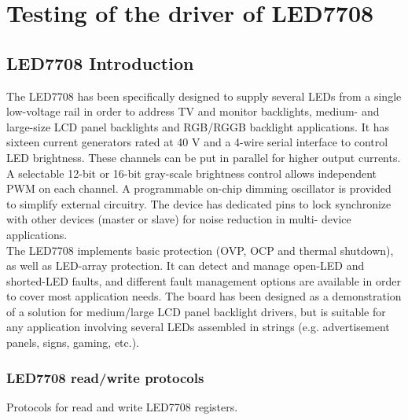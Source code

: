 \chapter{Testing of the driver of LED7708}
\section{LED7708 Introduction}
The LED7708 has been specifically designed to supply several LEDs from a single low-voltage rail in
order to address TV and monitor backlights, medium- and large-size LCD panel backlights and
RGB/RGGB backlight applications. It has sixteen current generators rated at 40 V and a 4-wire serial
interface to control LED brightness. These channels can be put in parallel for higher output currents. A
selectable 12-bit or 16-bit gray-scale brightness control allows independent PWM on each channel. A
programmable on-chip dimming oscillator is provided to simplify external circuitry. The device has
dedicated pins to lock synchronize with other devices (master or slave) for noise reduction in multi-
device applications.\\
The LED7708 implements basic protection (OVP, OCP and thermal shutdown), as well as LED-array
protection. It can detect and manage open-LED and shorted-LED faults, and different fault
management options are available in order to cover most application needs. The board has been
designed as a demonstration of a solution for medium/large LCD panel backlight drivers, but is
suitable for any application involving several LEDs assembled in strings (e.g. advertisement panels,
signs, gaming, etc.).
\subsection{LED7708 read/write protocols}
Protocols for read and write LED7708 registers.
